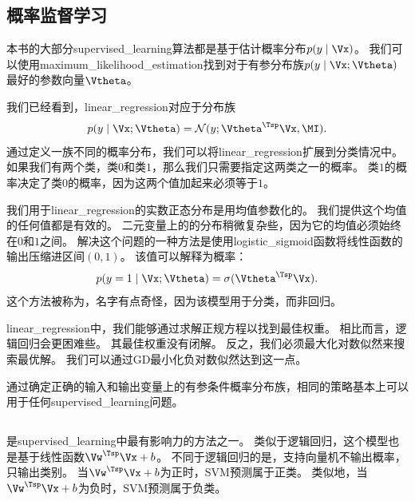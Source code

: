
\subsection{概率监督学习}
\label{sec:probabilistic_supervised_learning}
本书的大部分\gls{supervised_learning}算法都是基于估计概率分布$p(y\mid\Vx)$。
我们可以使用\gls{maximum_likelihood_estimation}找到对于有参分布族$p(y\mid\Vx;\Vtheta)$最好的参数向量$\Vtheta$。 

我们已经看到，\gls{linear_regression}对应于分布族
\begin{equation}
    p(y \mid \Vx; \Vtheta) = \mathcal{N}( y; \Vtheta^\Tsp \Vx, \MI).
\end{equation}
通过定义一族不同的概率分布，我们可以将\gls{linear_regression}扩展到分类情况中。
如果我们有两个类，类$0$和类$1$，那么我们只需要指定这两类之一的概率。
类$1$的概率决定了类$0$的概率，因为这两个值加起来必须等于$1$。

我们用于\gls{linear_regression}的实数正态分布是用均值参数化的。
我们提供这个均值的任何值都是有效的。
二元变量上的的分布稍微复杂些，因为它的均值必须始终在$0$和$1$之间。
解决这个问题的一种方法是使用\gls{logistic_sigmoid}函数将线性函数的输出压缩进区间$(0,1)$。
该值可以解释为概率：
\begin{equation}
    p(y = 1 \mid \Vx; \Vtheta) = \sigma(\Vtheta^\Tsp \Vx).
\end{equation}
这个方法被称为，名字有点奇怪，因为该模型用于分类，而非回归。

\gls{linear_regression}中，我们能够通过求解正规方程以找到最佳权重。
相比而言，逻辑回归会更困难些。
其最佳权重没有闭解。
反之，我们必须最大化对数似然来搜索最优解。
我们可以通过\gls{GD}最小化负对数似然达到这一点。

通过确定正确的输入和输出变量上的有参条件概率分布族，相同的策略基本上可以用于任何\gls{supervised_learning}问题。

\subsection{}
\label{sec:support_vector_machines}
是\gls{supervised_learning}中最有影响力的方法之一\citep{Boser92,Cortes95}。
类似于逻辑回归，这个模型也是基于线性函数$\Vw^\Tsp \Vx + b$。
不同于逻辑回归的是，支持向量机不输出概率，只输出类别。
当$\Vw^\Tsp\Vx + b$为正时，\gls{SVM}预测属于正类。
类似地，当$\Vw^\Tsp\Vx + b$为负时，\gls{SVM}预测属于负类。


